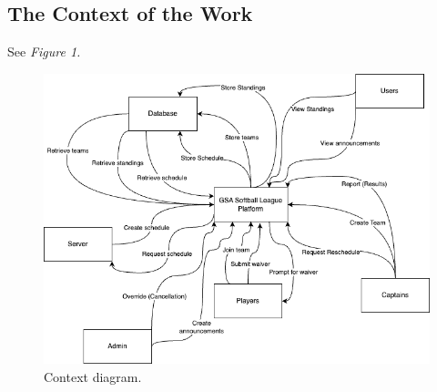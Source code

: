 \documentclass[12pt]{article}
\begin{document}
\subsection{The Context of the Work}
See \textit{Figure 1.}
\begin{figure}
	\includegraphics[width=\linewidth]{Context_diagram.png}
	\caption{Context diagram.}
	\label{fig:context_diagram}
\end{figure}
\pagebreak
\end{document}
